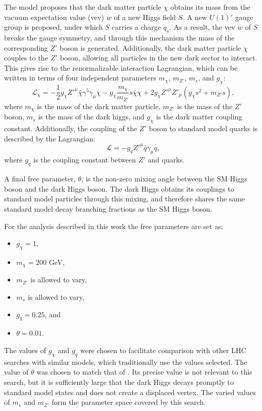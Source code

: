 The model proposes that the dark matter particle $\chi$ obtains its mass from the vacuum expectation value (vev) $w$ of a new Higgs field $S$. A new $U(1)'$ gauge group is proposed, under which $S$ carries a charge $q_s$. As a result, the vev $w$ of $S$ breaks the gauge symmetry, and through this mechanism the mass of the corresponding $Z'$ boson is generated. Additionally, the dark matter particle $\chi$ couples to the $Z'$ boson, allowing all particles in the new dark sector to interact. This gives rise to the renormalizable interaction Lagrangian, which can be written in terms of four independent parameters $m_{\chi}$, $m_{Z'}$, $m_{s}$, and $g_{\chi}$:
\begin{equation}
\mathcal{L}_{\chi} = -\frac{1}{2}g_{\chi}Z'^{\mu}\bar{\chi}\gamma^5\gamma_{\mu}\chi - g_{\chi}\frac{m_{\chi}}{m_{Z'}}s\bar{\chi}\chi + 2g_{\chi}Z'^{\mu}Z'_{\mu}(g_{\chi}s^2 + m_{Z'}s),
\end{equation}
where $m_{\chi}$ is the mass of the dark matter particle, $m_{Z'}$ is the mass of the $Z'$ boson, $m_{s}$ is the mass of the dark higgs, and $g_{\chi}$ is the dark matter coupling constant.
Additionally, the coupling of the $Z'$ boson to standard model quarks is described by the Lagrangian:
\begin{equation}
\mathcal{L} = -g_qZ'^{\mu}\bar{q}\gamma_{\mu}q,
\end{equation}
where $g_q$ is the coupling constant between $Z'$ and quarks.

A final free parameter, $\theta$, is the non-zero mixing angle between the SM Higgs boson and the dark Higgs boson. The dark Higgs obtains its couplings to standard model particles through this mixing, and therefore shares the same standard model decay branching fractions as the SM Higgs boson.

For the analysis described in this work the free parameters are set as:

\begin{itemize}
    \item $g_{\chi} = 1$,
    \item $m_{\chi} = 200$ GeV,
    \item $m_{Z'}$ is allowed to vary,
    \item $m_s$ is allowed to vary,
    \item $g_q = 0.25$, and
    \item $\theta = 0.01$.
\end{itemize}

The values of $g_{\chi}$ and $g_{q}$ were chosen to facilitate comparison with other LHC searches with similar models, which traditionally use the values selected. The value of $\theta$ was chosen to match that of \cite{Hunting}. Its precise value is not relevant to this search, but it is sufficiently large that the dark Higgs decays promptly to standard model states and does not create a displaced vertex. The varied values of $m_s$ and $m_{Z'}$ form the parameter space covered by this search.
